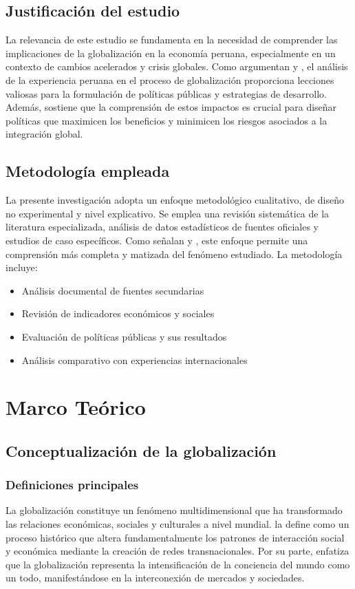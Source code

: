 \documentclass[12pt, a4paper]{article}
\begin{document}
\subsection{Justificación del estudio}
La relevancia de este estudio se fundamenta en la necesidad de comprender las implicaciones de la globalización en la economía peruana, especialmente en un contexto de cambios acelerados y crisis globales. Como argumentan \cite{mendoza2020} y \cite{castillo2018}, el análisis de la experiencia peruana en el proceso de globalización proporciona lecciones valiosas para la formulación de políticas públicas y estrategias de desarrollo. Además, \cite{seminario2019} sostiene que la comprensión de estos impactos es crucial para diseñar políticas que maximicen los beneficios y minimicen los riesgos asociados a la integración global.

\subsection{Metodología empleada}
La presente investigación adopta un enfoque metodológico cualitativo, de diseño no experimental y nivel explicativo. Se emplea una revisión sistemática de la literatura especializada, análisis de datos estadísticos de fuentes oficiales y estudios de caso específicos. Como señalan \cite{barrantes2021} y \cite{lopez2020}, este enfoque permite una comprensión más completa y matizada del fenómeno estudiado. La metodología incluye:

\begin{itemize}
    \item Análisis documental de fuentes secundarias
    \item Revisión de indicadores económicos y sociales
    \item Evaluación de políticas públicas y sus resultados
    \item Análisis comparativo con experiencias internacionales
\end{itemize}

\section{Marco Teórico}

\subsection{Conceptualización de la globalización}

\subsubsection{Definiciones principales}
La globalización constituye un fenómeno multidimensional que ha transformado las relaciones económicas, sociales y culturales a nivel mundial. \cite{held2000} la define como un proceso histórico que altera fundamentalmente los patrones de interacción social y económica mediante la creación de redes transnacionales. Por su parte, \cite{robertson2003} enfatiza que la globalización representa la intensificación de la conciencia del mundo como un todo, manifestándose en la interconexión de mercados y sociedades.
\end{document}
